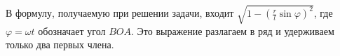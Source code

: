 В формулу, получаемую при решении задачи,
входит $\sqrt{1 - \left(\frac{r}{l}\sin{\varphi}\right)^2}$,
где $\varphi = \omega t$ обозначает угол $BOA$.
Это выражение разлагаем в ряд и удерживаем только два первых члена.
